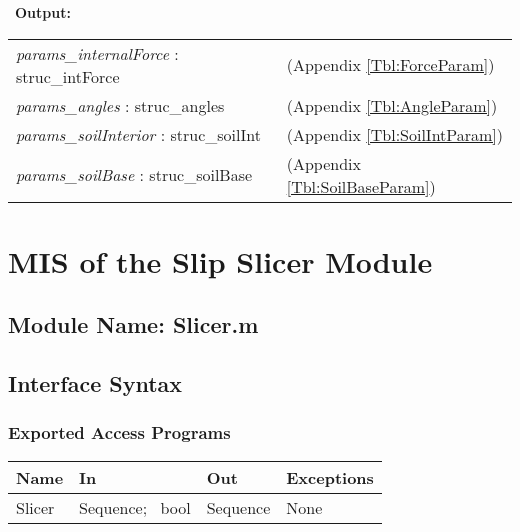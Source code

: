 \documentclass[12pt, titlepage]{article}
\begin{document}
~\newline\noindent \textbf{Output:}
\renewcommand*{\arraystretch}{1.5}
\begin{longtable}{p{} p{}}
  \textit{params\_internalForce} : struc\_intForce & (Appendix
  \ref{Tbl:ForceParam})\\
  
  \textit{params\_angles} : struc\_angles & (Appendix \ref{Tbl:AngleParam})\\

  \textit{params\_soilInterior} : struc\_soilInt & (Appendix
  \ref{Tbl:SoilIntParam})\\

  \textit{params\_soilBase} : struc\_soilBase & (Appendix
  \ref{Tbl:SoilBaseParam})\\
\end{longtable}


\section{MIS of the Slip Slicer Module} \label{sec:SlicerMod}

\subsection{Module Name: Slicer.m}

\subsection{Interface Syntax}

\subsubsection{Exported Access Programs}
\begin{center}
\renewcommand*{\arraystretch}{1.5}
\begin{tabular}{| p{} | p{} | 
  p{} | p{} |} \hline 
  \textbf{Name} & \textbf{In} & \textbf{Out} & \textbf{Exceptions}
  \\ \hline

  Slicer & Sequence; ~\newline bool & Sequence & None \\ \hline

\end{tabular}
\end{center}
\end{document}
